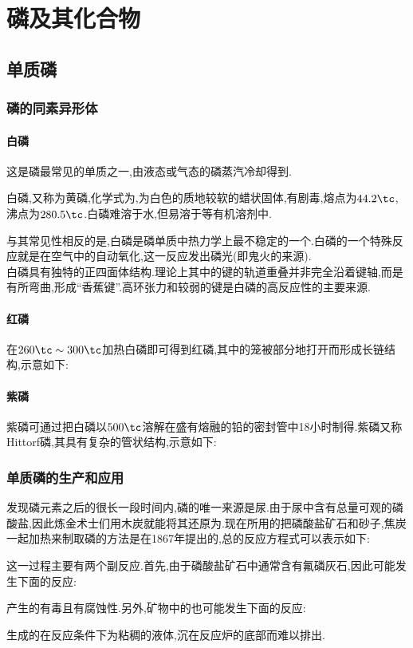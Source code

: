 \documentclass{ctexart}
\begin{document}
\section{磷及其化合物}
\subsection{单质磷}
\subsubsection{磷的同素异形体}
\paragraph{白磷}
这是磷最常见的单质之一,由液态或气态的磷蒸汽冷却得到.
\begin{substance}[\ce{P4}]
    白磷,又称为黄磷,化学式为,为白色的质地较软的蜡状固体,有剧毒,熔点为$44.2\tc$,沸点为$280.5\tc$.白磷难溶于水,但易溶于等有机溶剂中.
\end{substance}
与其常见性相反的是,白磷是磷单质中热力学上最不稳定的一个.白磷的一个特殊反应就是在空气中的自动氧化,这一反应发出磷光(即鬼火的来源).\\
\indent 白磷具有独特的正四面体结构.理论上其中的键的轨道重叠并非完全沿着键轴,而是有所弯曲,形成“香蕉键”.高环张力和较弱的键是白磷的高反应性的主要来源.
\paragraph{红磷}
在$260\tc\sim300\tc$加热白磷即可得到红磷,其中的笼被部分地打开而形成长链结构,示意如下:
\paragraph{紫磷}
紫磷可通过把白磷以$500\tc$溶解在盛有熔融的铅的密封管中18小时制得.紫磷又称Hittorf磷,其具有复杂的管状结构,示意如下:

\subsubsection{单质磷的生产和应用}
发现磷元素之后的很长一段时间内,磷的唯一来源是尿.由于尿中含有总量可观的磷酸盐,因此炼金术士们用木炭就能将其还原为.现在所用的把磷酸盐矿石和砂子,焦炭一起加热来制取磷的方法是在1867年提出的,总的反应方程式可以表示如下:
\begin{center}
\end{center}
这一过程主要有两个副反应.首先,由于磷酸盐矿石中通常含有氟磷灰石,因此可能发生下面的反应:
\begin{center}
\end{center}
产生的有毒且有腐蚀性.另外,矿物中的也可能发生下面的反应:
\begin{center}
\end{center}
生成的在反应条件下为粘稠的液体,沉在反应炉的底部而难以排出.
\end{document}
